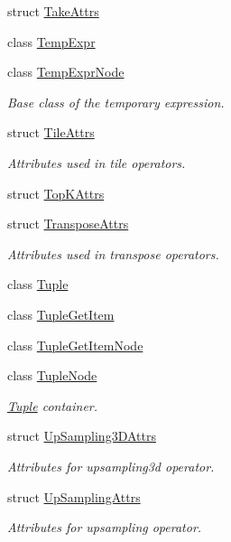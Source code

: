 \begin{DoxyCompactItemize}
struct \hyperlink{structtvm_1_1relay_1_1TakeAttrs}{Take\+Attrs}
\item 
class \hyperlink{classtvm_1_1relay_1_1TempExpr}{Temp\+Expr}
\item 
class \hyperlink{classtvm_1_1relay_1_1TempExprNode}{Temp\+Expr\+Node}
\begin{DoxyCompactList}\small\item\em Base class of the temporary expression. \end{DoxyCompactList}\item 
struct \hyperlink{structtvm_1_1relay_1_1TileAttrs}{Tile\+Attrs}
\begin{DoxyCompactList}\small\item\em Attributes used in tile operators. \end{DoxyCompactList}\item 
struct \hyperlink{structtvm_1_1relay_1_1TopKAttrs}{Top\+K\+Attrs}
\item 
struct \hyperlink{structtvm_1_1relay_1_1TransposeAttrs}{Transpose\+Attrs}
\begin{DoxyCompactList}\small\item\em Attributes used in transpose operators. \end{DoxyCompactList}\item 
class \hyperlink{classtvm_1_1relay_1_1Tuple}{Tuple}
\item 
class \hyperlink{classtvm_1_1relay_1_1TupleGetItem}{Tuple\+Get\+Item}
\item 
class \hyperlink{classtvm_1_1relay_1_1TupleGetItemNode}{Tuple\+Get\+Item\+Node}
\item 
class \hyperlink{classtvm_1_1relay_1_1TupleNode}{Tuple\+Node}
\begin{DoxyCompactList}\small\item\em \hyperlink{classtvm_1_1relay_1_1Tuple}{Tuple} container. \end{DoxyCompactList}\item 
struct \hyperlink{structtvm_1_1relay_1_1UpSampling3DAttrs}{Up\+Sampling3\+D\+Attrs}
\begin{DoxyCompactList}\small\item\em Attributes for upsampling3d operator. \end{DoxyCompactList}\item 
struct \hyperlink{structtvm_1_1relay_1_1UpSamplingAttrs}{Up\+Sampling\+Attrs}
\begin{DoxyCompactList}\small\item\em Attributes for upsampling operator. \end{DoxyCompactList}\item 

\end{DoxyCompactItemize}
